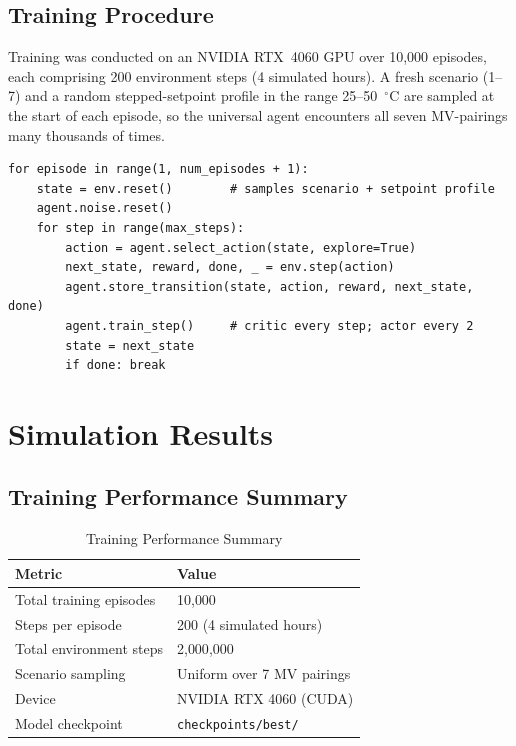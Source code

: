 \documentclass[12pt,a4paper]{article}
\begin{document}
\subsection{Training Procedure}

Training was conducted on an NVIDIA RTX~4060 GPU over 10{,}000 episodes, each
comprising 200 environment steps (4 simulated hours). A fresh scenario (1--7)
and a random stepped-setpoint profile in the range 25--50~$^\circ$C are sampled
at the start of each episode, so the universal agent encounters all seven
MV-pairings many thousands of times.

\begin{lstlisting}[style=python, caption={Core training loop (\texttt{train.py}).}]
for episode in range(1, num_episodes + 1):
    state = env.reset()        # samples scenario + setpoint profile
    agent.noise.reset()
    for step in range(max_steps):
        action = agent.select_action(state, explore=True)
        next_state, reward, done, _ = env.step(action)
        agent.store_transition(state, action, reward, next_state, done)
        agent.train_step()     # critic every step; actor every 2
        state = next_state
        if done: break
\end{lstlisting}

\section{Simulation Results}

\subsection{Training Performance Summary}

\begin{table}[H]
  \centering
  \caption{Training Performance Summary}
  \label{tab:training}
  \renewcommand{\arraystretch}{1.3}
  \begin{tabular}{@{}ll@{}}
    \toprule
    \textbf{Metric} & \textbf{Value} \\
    \midrule
    Total training episodes   & 10{,}000 \\
    Steps per episode         & 200 (4 simulated hours) \\
    Total environment steps   & 2{,}000{,}000 \\
    Scenario sampling         & Uniform over 7 MV pairings \\
    Device                    & NVIDIA RTX 4060 (CUDA) \\
    Model checkpoint          & \texttt{checkpoints/best/} \\
    \bottomrule
  \end{tabular}
\end{table}
\end{document}
